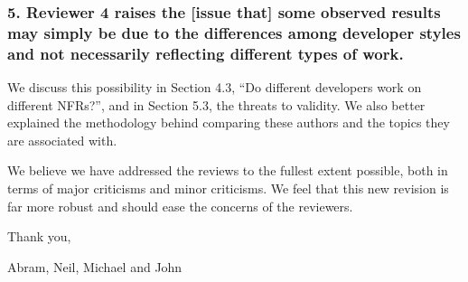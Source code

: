 \documentclass{article}
\begin{document}
\subsubsection*{5. Reviewer 4 raises the [issue that] some observed results may simply be due to
 the differences among developer styles and not necessarily
 reflecting different types of work. }

We discuss this possibility in Section 4.3, ``Do different
developers work on different NFRs?'',  and in Section 5.3, the threats to validity. We
also better explained the methodology behind comparing these authors
and the topics they are associated with. 

We believe we have addressed the reviews to the fullest extent possible,
both in terms of major criticisms and minor criticisms. We feel that
this new revision is far more robust and should ease the concerns of the
reviewers.

\vspace{2mm}

Thank you,

\vspace{3mm}

Abram, Neil, Michael and John
\end{document}
